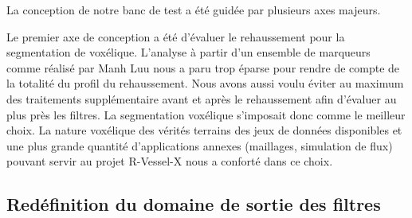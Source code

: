   \begin{table}
    \begin{center}
    \end{center}
    \caption{Origine des méthodes}
    \label{Tab:origins_vesselness}
  \end{table}

La conception de notre banc de test a été guidée par plusieurs axes majeurs.
  
Le premier axe de conception a été d'évaluer le rehaussement pour la segmentation de voxélique. L'analyse à partir d'un ensemble de marqueurs comme réalisé par Manh Luu nous a paru trop éparse pour rendre de compte de la totalité du profil du rehaussement. Nous avons aussi voulu éviter au maximum des traitements supplémentaire avant et après le rehaussement afin d'évaluer au plus près les filtres. La segmentation voxélique s'imposait donc comme le meilleur choix. La nature voxélique des vérités terrains des jeux de données disponibles et une plus grande quantité d'applications annexes (maillages, simulation de flux) pouvant servir au projet R-Vessel-X  nous a conforté dans ce choix.

\subsection{Redéfinition du domaine de sortie des filtres}

